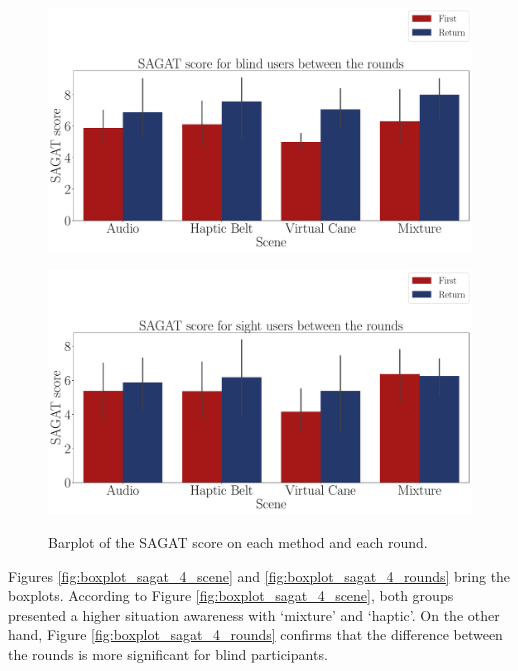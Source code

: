 \begin{figure}[!htb]
    \centering
    \begin{minipage}{\textwidth}
        \centering
        \includegraphics[width = \textwidth]{Resultados/Sagat/Figuras/pdf/barplot_sagat_avg_4_scene_blind.pdf}
        \label{fig:barplot_sagat_avg_4_scene_blind}
    \end{minipage}
    \begin{minipage}{\textwidth}
        \centering
        \includegraphics[width = \textwidth]{Resultados/Sagat/Figuras/pdf/barplot_sagat_avg_4_scene_sight.pdf}
        \label{fig:barplot_sagat_avg_4_scene_sight}
    \end{minipage}
    \caption{Barplot of the SAGAT score on each method and each round.}
    \label{fig:barplot_sagat_avg_4_scene_blind_sight}
\end{figure}

Figures \ref{fig:boxplot_sagat_4_scene} and \ref{fig:boxplot_sagat_4_rounds} bring the boxplots. According to Figure \ref{fig:boxplot_sagat_4_scene}, both groups presented a higher situation awareness with ‘mixture’ and ‘haptic’. On the other hand, Figure \ref{fig:boxplot_sagat_4_rounds} confirms that the difference between the rounds is more significant for blind participants. 

